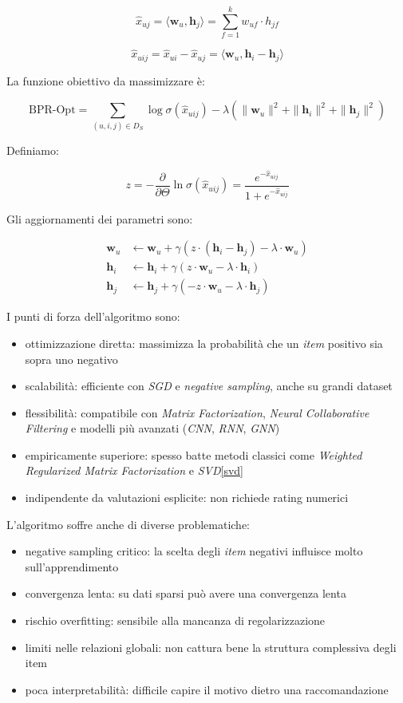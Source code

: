 \[
\hat{x}_{uj} = \langle \mathbf{w}_u, \mathbf{h}_j \rangle = \sum_{f=1}^{k} w_{uf} \cdot h_{jf}
\]

\[
\hat{x}_{uij} = \hat{x}_{ui} - \hat{x}_{uj} = \langle \mathbf{w}_u, \mathbf{h}_i - \mathbf{h}_j \rangle
\]


La funzione obiettivo da massimizzare è:

\[
\text{BPR-Opt} = \sum_{(u,i,j) \in D_S} \log \sigma(\hat{x}_{uij}) 
- \lambda \left( \|\mathbf{w}_u\|^2 + \|\mathbf{h}_i\|^2 + \|\mathbf{h}_j\|^2 \right)
\]

Definiamo:

\[
z = -\frac{\partial}{\partial \Theta} \ln \sigma(\hat{x}_{uij}) = \frac{e^{-\hat{x}_{uij}}}{1 + e^{-\hat{x}_{uij}}}
\]

Gli aggiornamenti dei parametri sono:

\begin{align*}
\mathbf{w}_u &\leftarrow \mathbf{w}_u + \gamma \left( z \cdot (\mathbf{h}_i - \mathbf{h}_j) - \lambda \cdot \mathbf{w}_u \right) \\
\mathbf{h}_i &\leftarrow \mathbf{h}_i + \gamma \left( z \cdot \mathbf{w}_u - \lambda \cdot \mathbf{h}_i \right) \\
\mathbf{h}_j &\leftarrow \mathbf{h}_j + \gamma \left( -z \cdot \mathbf{w}_u - \lambda \cdot \mathbf{h}_j \right)
\end{align*}

I punti di forza dell'algoritmo sono:

\begin{itemize}
    \item ottimizzazione diretta: massimizza la probabilità che un \textit{item} positivo sia sopra uno negativo
    \item scalabilità: efficiente con \textit{SGD} e \textit{negative sampling}, anche su grandi dataset
    \item flessibilità: compatibile con \textit{Matrix Factorization}, \textit{Neural Collaborative Filtering} e modelli più avanzati (\textit{CNN}, \textit{RNN}, \textit{GNN})
    \item empiricamente superiore: spesso batte metodi classici come \textit{Weighted Regularized Matrix Factorization} e \textit{SVD}\ref{svd}
    \item indipendente da valutazioni esplicite: non richiede rating numerici
\end{itemize}

L'algoritmo soffre anche di diverse problematiche:

\begin{itemize}
    \item negative sampling critico: la scelta degli \textit{item} negativi influisce molto sull'apprendimento
    \item convergenza lenta: su dati sparsi può avere una convergenza lenta
    \item rischio overfitting: sensibile alla mancanza di regolarizzazione
    \item limiti nelle relazioni globali: non cattura bene la struttura complessiva degli item
    \item poca interpretabilità: difficile capire il motivo dietro una raccomandazione
\end{itemize}

